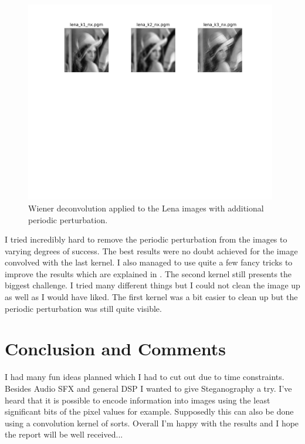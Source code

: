 \documentclass[10pt, titlepage, a4paper]{article}
\begin{document}
\begin{figure}[H]
    \centering
    \includegraphics[width=0.98\textwidth]{../ImageDeconvolution/Images/lena-periodic.png}
    \caption{Wiener deconvolution applied to the Lena images with additional periodic perturbation.}
    \label{fig:lena-4}
\end{figure}

I tried incredibly hard to remove the periodic perturbation from the images to varying degrees of success. The best results 
were no doubt achieved for the image convolved with the last kernel. I also managed to use quite a few fancy tricks to improve 
the results which are explained in \cite{sigproc}. The second kernel still presents the biggest challenge. I tried many different things but I could not clean the 
image up as well as I would have liked. The first kernel was a bit easier to clean up but the periodic perturbation was still
quite visible.

\section{Conclusion and Comments}
I had many fun ideas planned which I had to cut out due to time constraints. Besides Audio SFX and general DSP I wanted 
to give Steganography a try. I've heard that it is possible to encode information into images using the least significant
bits of the pixel values for example. Supposedly this can also be done using a convolution kernel of sorts. Overall I'm happy with 
the results and I hope the report will be well received... \\
\end{document}
